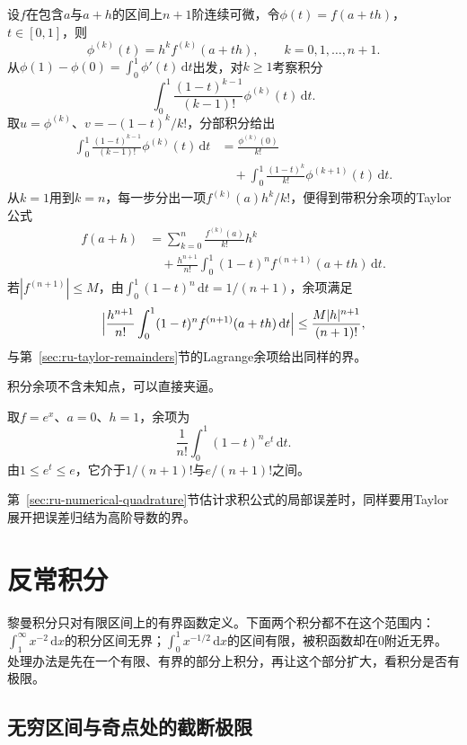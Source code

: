 设$f$在包含$a$与$a+h$的区间上$n+1$阶连续可微，令$\phi(t)=f(a+th)$，$t\in[0,1]$，则
\[
  \phi^{(k)}(t)=h^kf^{(k)}(a+th),\qquad k=0,1,\ldots,n+1.
\]
从$\phi(1)-\phi(0)=\int_0^1\phi'(t)\,\mathrm dt$出发，对$k\geq1$考察积分
\[
 \int_0^1\frac{(1-t)^{k-1}}{(k-1)!}\phi^{(k)}(t)\,\mathrm dt.
\]
取$u=\phi^{(k)}$、$v=-(1-t)^k/k!$，分部积分给出
\[
 \begin{aligned}
 \int_0^1\frac{(1-t)^{k-1}}{(k-1)!}\phi^{(k)}(t)\,\mathrm dt
 &=\frac{\phi^{(k)}(0)}{k!}\\
 &\quad+\int_0^1\frac{(1-t)^k}{k!}\phi^{(k+1)}(t)\,\mathrm dt.
 \end{aligned}
\]
从$k=1$用到$k=n$，每一步分出一项$f^{(k)}(a)h^k/k!$，便得到带积分余项的Taylor公式
\begin{equation}
 \begin{aligned}
 f(a+h)&=\sum_{k=0}^n\frac{f^{(k)}(a)}{k!}h^k\\
 &\quad+\frac{h^{n+1}}{n!}\int_0^1(1-t)^nf^{(n+1)}(a+th)\,\mathrm dt.
 \end{aligned}
 \label{eq:ru-taylor-integral-remainder}
\end{equation}
\BookEquationAliases{\label{eq:analysis-taylor-integral-remainder}}
若$|f^{(n+1)}|\leq M$，由$\int_0^1(1-t)^n\,\mathrm dt=1/(n+1)$，余项满足
\[
 \Bigl|\frac{h^{n+1}}{n!}\int_0^1(1-t)^nf^{(n+1)}(a+th)\,\mathrm dt\Bigr|\leq\frac{M|h|^{n+1}}{(n+1)!},
\]
与第~\ref{sec:ru-taylor-remainders}节的Lagrange余项给出同样的界。

积分余项不含未知点，可以直接夹逼。
\begin{example}[指数函数积分余项的夹逼]
\label{ex:ru-exp-integral-remainder}
取$f=e^x$、$a=0$、$h=1$，余项为
\[
 \frac1{n!}\int_0^1(1-t)^ne^t\,\mathrm dt.
\]
由$1\leq e^t\leq e$，它介于$1/(n+1)!$与$e/(n+1)!$之间。
\end{example}

第~\ref{sec:ru-numerical-quadrature}节估计求积公式的局部误差时，同样要用Taylor展开把误差归结为高阶导数的界。
\section{反常积分}
\label{sec:ru-improper-integrals}

黎曼积分只对有限区间上的有界函数定义。下面两个积分都不在这个范围内：$\int_1^\infty x^{-2}\,\mathrm dx$的积分区间无界；$\int_0^1x^{-1/2}\,\mathrm dx$的区间有限，被积函数却在$0$附近无界。
处理办法是先在一个有限、有界的部分上积分，再让这个部分扩大，看积分是否有极限。

\subsection{无穷区间与奇点处的截断极限}
\label{sec:ru-improper-definition}

